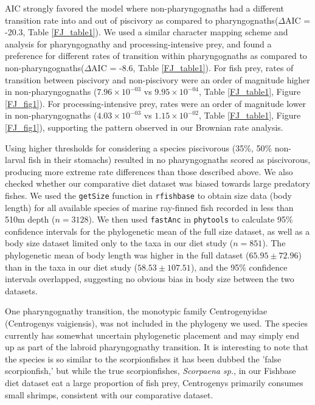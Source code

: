 AIC strongly favored the model where non-pharyngognaths had a different transition rate into and out of piscivory as compared to pharyngognaths($\Delta$AIC = -20.3, Table \ref{FJ_table1}). We used a similar character mapping scheme and analysis for pharyngognathy and processing-intensive prey, and found a preference for different rates of transition within pharyngognaths as compared to non-pharyngognaths($\Delta$AIC = -8.6, Table \ref{FJ_table1}). For fish prey, rates of transition between piscivory and non-piscivory were an order of magnitude higher in non-pharyngognaths ($7.96\times 10^{-03}$ vs $9.95\times 10^{-04}$, Table \ref{FJ_table1}, Figure \ref{FJ_fig1}). For processing-intensive prey, rates were an order of magnitude lower in non-pharyngognaths ($4.03\times 10^{-03}$ vs $1.15\times 10^{-02}$, Table \ref{FJ_table1}, Figure \ref{FJ_fig1}), supporting the pattern observed in our Brownian rate analysis. 

Using higher thresholds for considering a species piscivorous (35\%, 50\% non-larval fish in their stomachs) resulted in no pharyngognaths scored as piscivorous, producing more extreme rate differences than those described above. We also checked whether our comparative diet dataset was biased towards large predatory fishes. We used the {\tt getSize} function in {\tt rfishbase} to obtain size data (body length) for all available species of marine ray-finned fish recorded in less than  510m depth ($n=3128$). We then used {\tt fastAnc} in {\tt phytools} to calculate 95\% confidence intervals for the phylogenetic mean of the full size dataset, as well as a body size dataset limited only to the taxa in our diet study ($n=851$). The phylogenetic mean of body length was higher in the full dataset ($65.95\pm 72.96$) than in the taxa in our diet study ($58.53\pm 107.51$), and the 95\% confidence intervals overlapped, suggesting no obvious bias in body size between the two datasets.

One pharyngognathy transition, the monotypic family Centrogenyidae (Centrogenys vaigiensis), was not included in the phylogeny we used. The species currently has somewhat uncertain phylogenetic placement and may simply end up as part of the labroid pharyngognathy transition. \cite{wainwright_evolution_2012, betancur2013tree} It is interesting to note that the species is so similar to the scorpionfishes it has been dubbed the 'false scorpionfish,' but while the true scorpionfishes, {\em Scorpaena sp.}, in our Fishbase diet dataset eat a large proportion of fish prey, Centrogenys primarily consumes small shrimps, \cite{kwik2011biology} consistent with our comparative dataset.

